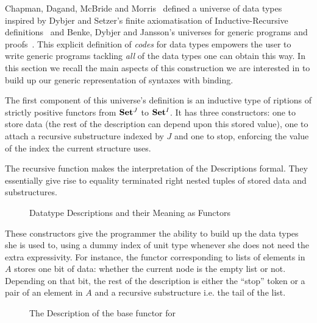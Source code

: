 Chapman, Dagand, McBride and Morris~\citeyear{Chapman:2010:GAL:1863543.1863547}
defined a universe of data types inspired by Dybjer and Setzer's
finite axiomatisation of Inductive-Recursive definitions~\citeyear{Dybjer1999}
and Benke, Dybjer and Jansson's universes for generic programs and proofs~\citeyear{benke-ugpp}.
This explicit definition of \emph{codes} for data types empowers the
user to write generic programs tackling \emph{all} of the data types
one can obtain this way. In this section we recall the main aspects
of this construction we are interested in to build up our generic
representation of syntaxes with binding.

The first component of this universe's definition is an inductive type
of riptions of strictly positive functors from $\mathbf{Set}{}^J$ to
$\mathbf{Set}{}^I$. It has three constructors: one to store data (the rest of
the description can depend upon this stored value), one to attach a
recursive substructure indexed by $J$ and one to stop, enforcing the
value of the index the current structure uses.

The recursive function  makes the interpretation of the
Descriptions formal. They essentially give rise to equality
terminated right nested tuples of stored data and substructures.

\begin{figure}[h]
\hspace{-1em}\begin{minipage}{0.50\textwidth}
\end{minipage}\hspace{2em}
\begin{minipage}{0.40\textwidth}
\end{minipage}
\caption{Datatype Descriptions and their Meaning as Functors}\label{figure:desc}
\end{figure}

These constructors give the programmer the ability to build up the data
types she is used to, using a dummy index of unit type whenever she does
not need the extra expressivity. For instance, the functor corresponding
to lists of elements in $A$ stores one bit of data: whether the current
node is the empty list or not. Depending on that bit, the rest of the
description is either the ``stop'' token or a pair of an element in $A$
and a recursive substructure i.e. the tail of the list.

\begin{figure}[h]
\caption{The Description of the base functor for  }\label{figure:listD}
\end{figure}

